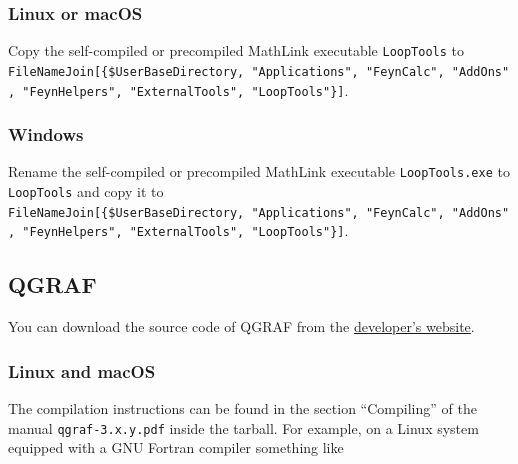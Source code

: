 \documentclass[../FeynHelpersManual.tex]{subfiles}
\begin{document}
\subsubsection{Linux or macOS}\label{linux-or-macos-1}

Copy the self-compiled or precompiled MathLink executable
\texttt{LoopTools} to
\texttt{FileNameJoin[\allowbreak{}\{\allowbreak{}\$UserBaseDirectory,\ \allowbreak{}"Applications",\ \allowbreak{}"FeynCalc",\ \allowbreak{}"AddOns",\ \allowbreak{}"FeynHelpers",\ \allowbreak{}"ExternalTools",\ \allowbreak{}"LoopTools"\}]}.

\subsubsection{Windows}\label{windows-4}

Rename the self-compiled or precompiled MathLink executable
\texttt{LoopTools.exe} to \texttt{LoopTools} and copy it to
\texttt{FileNameJoin[\allowbreak{}\{\allowbreak{}\$UserBaseDirectory,\ \allowbreak{}"Applications",\ \allowbreak{}"FeynCalc",\ \allowbreak{}"AddOns",\ \allowbreak{}"FeynHelpers",\ \allowbreak{}"ExternalTools",\ \allowbreak{}"LoopTools"\}]}.

\subsection{QGRAF}\label{qgraf}

You can download the source code of QGRAF from the
\href{http://cefema-gt.tecnico.ulisboa.pt/~paulo/qgraf.html}{developer's
website}.

\subsubsection{Linux and macOS}\label{linux-and-macos-1}

The compilation instructions can be found in the section ``Compiling''
of the manual \texttt{qgraf-3.x.y.pdf} inside the tarball. For example,
on a Linux system equipped with a GNU Fortran compiler something like

\begin{Shaded}
\begin{Highlighting}[]
\SpecialCharTok{{-}}
\end{Highlighting}
\end{Shaded}
\end{document}

